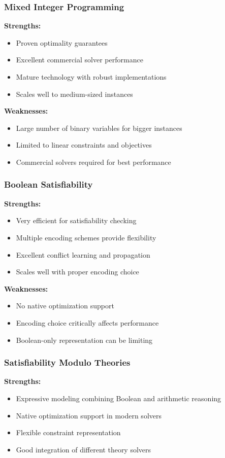 \documentclass[11pt]{article}
\begin{document}
\begin{itemize}
\subsubsection{Mixed Integer Programming}
\textbf{Strengths:}
\begin{itemize}
    \item Proven optimality guarantees
    \item Excellent commercial solver performance
    \item Mature technology with robust implementations
    \item Scales well to medium-sized instances
\end{itemize}

\textbf{Weaknesses:}
\begin{itemize}
    \item Large number of binary variables for bigger instances
    \item Limited to linear constraints and objectives
    \item Commercial solvers required for best performance
\end{itemize}

\subsubsection{Boolean Satisfiability}
\textbf{Strengths:}
\begin{itemize}
    \item Very efficient for satisfiability checking
    \item Multiple encoding schemes provide flexibility
    \item Excellent conflict learning and propagation
    \item Scales well with proper encoding choice
\end{itemize}

\textbf{Weaknesses:}
\begin{itemize}
    \item No native optimization support
    \item Encoding choice critically affects performance
    \item Boolean-only representation can be limiting
\end{itemize}

\subsubsection{Satisfiability Modulo Theories}
\textbf{Strengths:}
\begin{itemize}
    \item Expressive modeling combining Boolean and arithmetic reasoning
    \item Native optimization support in modern solvers
    \item Flexible constraint representation
    \item Good integration of different theory solvers
\end{itemize}


\end{itemize}
\end{document}
